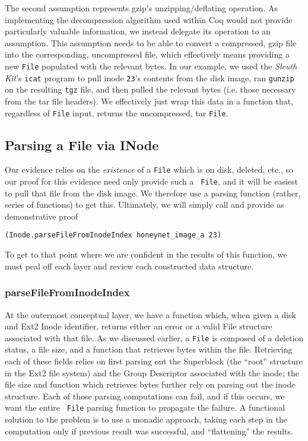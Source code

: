 \documentclass[nocopyrightspace]{sigplanconf}
\begin{document}
The second assumption represents gzip's unzipping/deflating operation. As
implementing the decompression algorithm used within Coq would not provide
particularly valuable information, we instead delegate its operation to an
assumption. This assumption needs to be able to convert a compressed, gzip
file into the corresponding, uncompressed file, which effectively means
providing a new {\tt File} populated with the relevant bytes. In our example,
we used the {\it Sleuth Kit}'s {\tt icat} program to pull inode {\tt 23}'s
contents from the disk image, ran {\tt gunzip} on the resulting {\tt tgz}
file, and then pulled the relevant bytes (i.e. those necessary from the tar
file headers). We effectively just wrap this data in a function that,
regardless of {\tt File} input, returns the uncompressed, tar {\tt File}.

\subsection{Parsing a File via INode}

Our evidence relies on the {\it existence} of a {\tt File} which is on disk,
deleted, etc., so our proof for this evidence need only provide such a {\tt
File}, and it will be easiest to pull that file from the disk image. We
therefore use a parsing function (rather, series of functions) to get this.
Ultimately, we will simply call and provide as demonstrative proof

\begin{lstlisting}
(Inode.parseFileFromInodeIndex honeynet_image_a 23)
\end{lstlisting}

To get to that point where we are confident in the results of this function,
we must peal off each layer and review each constructed data structure.

\subsubsection{parseFileFromInodeIndex}

At the outermost conceptual layer, we have a function which, when given a disk
and Ext2 Inode identifier, returns either an error or a valid File structure
associated with that file. As we discussed earlier, a {\tt File} is composed
of a deletion status, a file size, and a function that retrieves bytes within
the file. Retrieving each of these fields relies on first parsing out the
Superblock (the ``root'' structure in the Ext2 file system) and the Group
Descriptor associated with the inode; the file size and function which
retrieves bytes further rely on parsing out the inode structure. Each of those
parsing computations can fail, and if this occurs, we want the entire {\tt
File} parsing function to propagate the failure. A functional solution to the
problem is to use a monadic approach, taking each step in the computation only
if previous result was successful, and ``flattening'' the results. 
\end{document}
